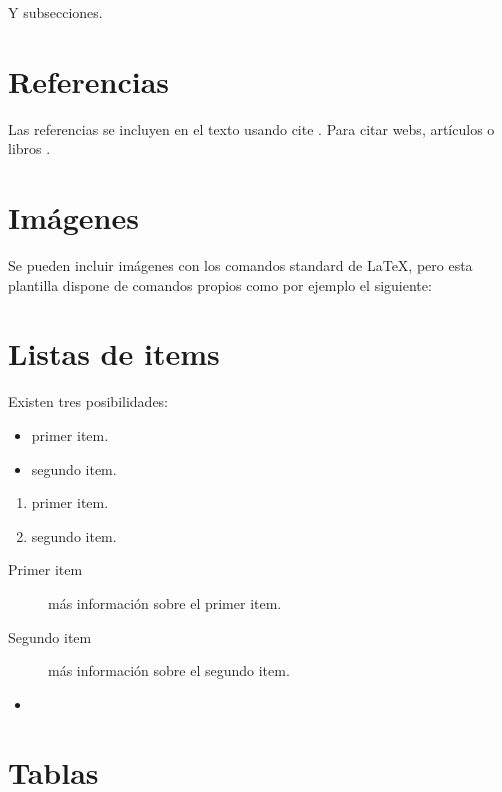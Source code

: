 Y subsecciones. 


\section{Referencias}

Las referencias se incluyen en el texto usando cite \cite{wiki:latex}. Para citar webs, artículos o libros \cite{koza92}.


\section{Imágenes}

Se pueden incluir imágenes con los comandos standard de \LaTeX, pero esta plantilla dispone de comandos propios como por ejemplo el siguiente:




\section{Listas de items}

Existen tres posibilidades:

\begin{itemize}
	\item primer item.
	\item segundo item.
\end{itemize}

\begin{enumerate}
	\item primer item.
	\item segundo item.
\end{enumerate}

\begin{description}
	\item[Primer item] más información sobre el primer item.
	\item[Segundo item] más información sobre el segundo item.
\end{description}
	
\begin{itemize}
\item 
\end{itemize}

\section{Tablas}

